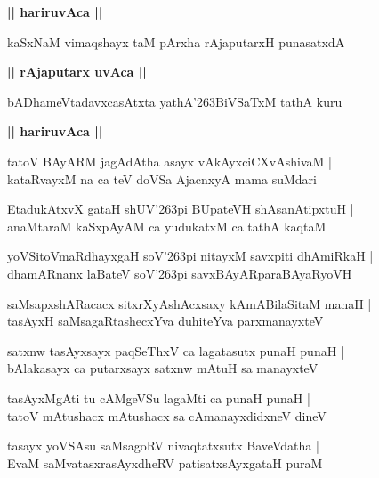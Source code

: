 \documentclass[twoside,12pt,openright]{book}
\def\S{\char'263}
\newcounter{shloka}[chapter]
\def\uvaca#1{\centerline{{\large\textbf{#1}}}}
\begin{document}
\uvaca{|| hariruvAca ||}

\begin{shloka}%
kaSxNaM vimaqshayx taM pArxha rAjaputarxH punasatxdA 
\end{shloka}

\uvaca{|| rAjaputarx uvAca ||}

\begin{shloka}%
bADhameVtadavxcasAtxta yathA\S BiVSaTxM tathA kuru
\end{shloka}

\uvaca{|| hariruvAca ||}

\begin{shloka}%
tatoV BAyARM jagAdAtha asayx vAkAyxciCXvAshivaM |\\
kataRvayxM na ca teV doVSa AjacnxyA mama suMdari
\end{shloka}

\begin{shloka}%
EtadukAtxvX gataH shUV\S pi BUpateVH shAsanAtipxtuH |\\
anaMtaraM kaSxpAyAM ca yudukatxM ca tathA kaqtaM 
\end{shloka}

\begin{shloka}%
yoVSitoVmaRdhayxgaH soV\S pi nitayxM savxpiti dhAmiRkaH |\\
dhamARnanx laBateV soV\S pi savxBAyARparaBAyaRyoVH 
\end{shloka}

\begin{shloka}%
saMsapxshARacacx sitxrXyAshAcxsaxy kAmABilaSitaM manaH |\\
tasAyxH saMsagaRtashecxYva duhiteYva parxmanayxteV 
\end{shloka}

\begin{shloka}%
satxnw tasAyxsayx paqSeThxV ca lagatasutx punaH punaH |\\
bAlakasayx ca putarxsayx satxnw mAtuH sa manayxteV 
\end{shloka}

\begin{shloka}%
tasAyxMgAti tu cAMgeVSu lagaMti ca punaH punaH |\\
tatoV mAtushacx mAtushacx sa cAmanayxdidxneV dineV 
\end{shloka}

\begin{shloka}%
tasayx yoVSAsu saMsagoRV nivaqtatxsutx BaveVdatha |\\
EvaM saMvatasxrasAyxdheRV patisatxsAyxgataH puraM
\end{shloka}
\end{document}
